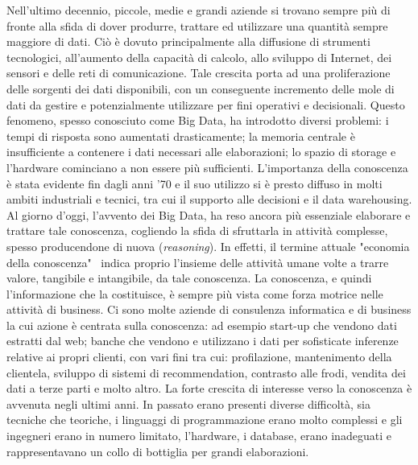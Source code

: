 Nell'ultimo decennio, piccole, medie e grandi aziende si trovano sempre più di fronte alla sfida di dover produrre, trattare ed utilizzare una quantità sempre maggiore di dati. Ciò è dovuto principalmente alla diffusione di strumenti tecnologici, all'aumento della capacità di calcolo, allo sviluppo di Internet, dei sensori e delle reti di comunicazione. \newline
Tale crescita porta ad una proliferazione delle sorgenti dei dati disponibili, con un conseguente incremento delle mole di dati da gestire e potenzialmente utilizzare per fini operativi e decisionali. Questo fenomeno, spesso conosciuto come Big Data, ha introdotto diversi problemi: i tempi di risposta sono aumentati drasticamente; la memoria centrale è insufficiente a contenere i dati necessari alle elaborazioni; lo spazio di storage e l'hardware cominciano a non essere più sufficienti. \newline
L'importanza della conoscenza è stata evidente fin dagli anni '70 e il suo utilizzo si è presto diffuso in molti ambiti industriali e tecnici, tra cui il supporto alle decisioni e il data warehousing. \newline
Al giorno d'oggi, l'avvento dei Big Data, ha reso ancora più essenziale elaborare e trattare tale conoscenza, cogliendo la sfida di sfruttarla in attività complesse, spesso producendone di nuova (\emph{reasoning}). \newline
In effetti, il termine attuale "economia della conoscenza"~\cite{WIKI:CONOSCENZA} indica proprio l'insieme delle attività umane volte a trarre valore, tangibile e intangibile, da tale conoscenza. La conoscenza, e quindi l'informazione che la costituisce, è sempre più vista come forza motrice nelle attività di business. Ci sono molte aziende di consulenza informatica e di business la cui azione è centrata sulla conoscenza: ad esempio start-up che vendono dati estratti dal web; banche che vendono e utilizzano i dati per sofisticate inferenze relative ai propri clienti, con vari fini tra cui: profilazione, mantenimento della clientela, sviluppo di sistemi di recommendation, contrasto alle frodi, vendita dei dati a terze parti e molto altro. \newline
La forte crescita di interesse verso la conoscenza è avvenuta negli ultimi anni. In passato erano presenti diverse difficoltà, sia tecniche che teoriche, i linguaggi di programmazione erano molto complessi e gli ingegneri erano in numero limitato, l'hardware, i database, erano inadeguati e rappresentavano un collo di bottiglia per grandi elaborazioni. \newline
